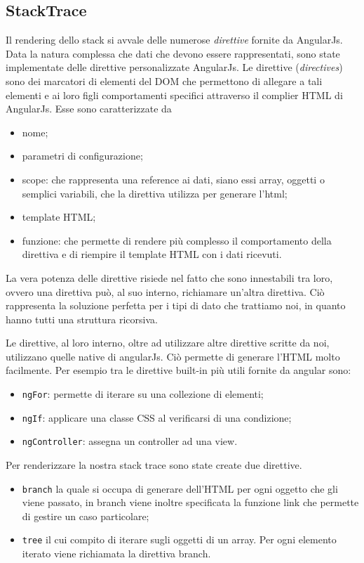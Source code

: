 \subsection{StackTrace} 
Il rendering dello stack si avvale delle numerose \emph{direttive} fornite da 
AngularJs. \\Data la natura complessa che dati che devono essere rappresentati, sono state 
implementate delle direttive personalizzate AngularJs. 
Le direttive (\emph{directives}) sono dei marcatori di elementi del DOM che permettono di allegare 
a tali elementi e ai loro figli comportamenti specifici attraverso il complier 
HTML di AngularJs. Esse sono  caratterizzate da 
\begin{itemize} 
	\item nome;
	\item parametri di configurazione;
	\item scope:  che rappresenta una reference ai dati, siano essi array, oggetti o 
	semplici variabili, che la direttiva utilizza per generare l'html;
	\item template HTML;
	\item funzione: che permette di rendere più complesso il comportamento della direttiva
	e di riempire il template HTML con i dati ricevuti.
\end{itemize} 

La vera potenza delle direttive risiede nel fatto che sono innestabili tra loro, 
ovvero una direttiva può, al suo interno, richiamare un'altra direttiva. Ciò 
rappresenta la soluzione perfetta per i tipi di dato che trattiamo noi, in quanto 
hanno tutti una struttura ricorsiva. 

Le direttive, al loro interno, oltre ad utilizzare altre direttive scritte da noi, 
utilizzano quelle native di angularJs. Ciò permette di generare l'HTML molto 
facilmente. Per esempio tra le direttive built-in più utili fornite da angular sono: 
\begin{itemize} 
	\item \texttt{ngFor}: permette di iterare su una collezione di elementi;
	\item \texttt{ngIf}: applicare una classe CSS al verificarsi di una condizione; 
	\item \texttt{ngController}: assegna un controller ad una view.
\end{itemize} 

Per renderizzare la nostra stack trace sono state create due direttive. 
\begin{itemize} 
	\item \texttt{branch} la quale si occupa di generare dell'HTML per ogni oggetto che gli viene passato, 
	in branch viene inoltre specificata la funzione link che permette di gestire un caso particolare;
	\item \texttt{tree} il cui compito di iterare sugli oggetti di un array. Per ogni elemento iterato viene richiamata 
	la direttiva branch. 
\end{itemize} 

